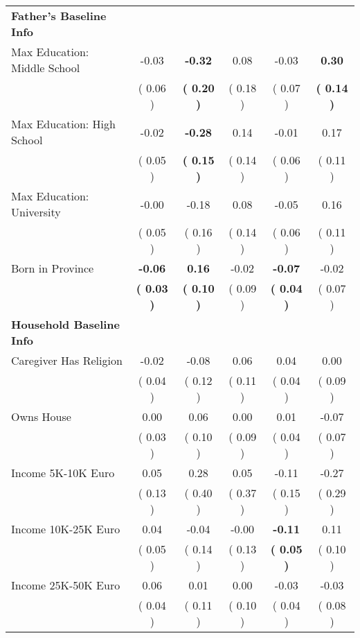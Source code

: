 \begin{table}[H]
{\begin{tabular}{lccccc}
\midrule
\textbf{Father's Baseline Info} \\
\quad Max Education: Middle School &     -0.03 & \textbf{    -0.32} &      0.08 &     -0.03 & \textbf{     0.30} \\
\quad  & (     0.06 ) & \textbf{(     0.20 )}  & (     0.18 )  & (     0.07 ) & \textbf{(     0.14 )} \\
\quad Max Education: High School &     -0.02 & \textbf{    -0.28} &      0.14 &     -0.01 &      0.17 \\
\quad  & (     0.05 ) & \textbf{(     0.15 )}  & (     0.14 )  & (     0.06 ) & (     0.11 ) \\
\quad Max Education: University &     -0.00 &     -0.18 &      0.08 &     -0.05 &      0.16 \\
\quad  & (     0.05 ) & (     0.16 )  & (     0.14 )  & (     0.06 ) & (     0.11 ) \\
\quad Born in Province & \textbf{    -0.06} & \textbf{     0.16} &     -0.02 & \textbf{    -0.07} &     -0.02 \\
\quad  & \textbf{(     0.03 )} & \textbf{(     0.10 )}  & (     0.09 )  & \textbf{(     0.04 )} & (     0.07 ) \\
\midrule
\textbf{Household Baseline Info} \\
\quad Caregiver Has Religion &     -0.02 &     -0.08 &      0.06 &      0.04 &      0.00 \\
\quad  & (     0.04 ) & (     0.12 )  & (     0.11 )  & (     0.04 ) & (     0.09 ) \\
\quad Owns House &      0.00 &      0.06 &      0.00 &      0.01 &     -0.07 \\
\quad  & (     0.03 ) & (     0.10 )  & (     0.09 )  & (     0.04 ) & (     0.07 ) \\
\quad Income 5K-10K Euro &      0.05 &      0.28 &      0.05 &     -0.11 &     -0.27 \\
\quad  & (     0.13 ) & (     0.40 )  & (     0.37 )  & (     0.15 ) & (     0.29 ) \\
\quad Income 10K-25K Euro &      0.04 &     -0.04 &     -0.00 & \textbf{    -0.11} &      0.11 \\
\quad  & (     0.05 ) & (     0.14 )  & (     0.13 )  & \textbf{(     0.05 )} & (     0.10 ) \\
\quad Income 25K-50K Euro &      0.06 &      0.01 &      0.00 &     -0.03 &     -0.03 \\
\quad  & (     0.04 ) & (     0.11 )  & (     0.10 )  & (     0.04 ) & (     0.08 ) \\

\end{tabular}}
\end{table}
